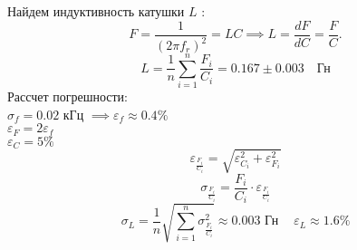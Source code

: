 \documentclass[10pt]{article}
\begin{document}
\begin{enumerate}
        Найдем индуктивность катушки $L$ :
        \begin{equation}
            F = \frac{1}{(2 \pi f_r)^2} = LC \implies L = \frac{dF}{dC} = \frac{F}{C}.
        \end{equation}
        \begin{equation}
            L = \frac{1}{n} \sum^{n}_{i=1} \frac{F_i}{C_i} = 0.167 \pm 0.003 \quad \text{Гн}
        \end{equation}
        Рассчет погрешности: \\
        $\sigma_f = 0.02$ кГц $\implies \varepsilon_f \approx 0.4 \% $ \\
        $ \varepsilon_F = 2 \varepsilon_f $ \\
        $\varepsilon_C = 5 \% $ \\
        \begin{equation}
        \varepsilon_{\frac{F_i}{C_i}} = \sqrt{\varepsilon^2_{C_i} + \varepsilon^2_{F_i}}
        \end{equation}
        \begin{equation}
        \sigma_{\frac{F_i}{C_i}} = \frac{F_i}{C_i} \cdot \varepsilon_{\frac{F_i}{C_i}}
        \end{equation}
        \begin{equation}
        \sigma_{L} = \frac{1}{n} \sqrt{\sum^n_{i=1} \sigma_{\frac{F_i}{C_i}} ^ 2} \approx 0.003 \text{ Гн}\
        \quad \varepsilon_{L} \approx 1.6 \%
        \end{equation}

    \end{enumerate}
\end{document}
